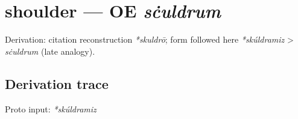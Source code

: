 \documentclass[
  british,
  a4paper,
  openany]{book}
\providecommand{\texorpdfstring}[2]{#1}
\begin{document}
\section{\texorpdfstring{shoulder --- OE
\emph{sċuldrum}}{shoulder --- OE sċuldrum}}\label{shoulder-oe-sux10buldrum}


Derivation: citation reconstruction \emph{*skuldrō}; form followed here
\emph{*skúldramiz} \textgreater{} \emph{sċuldrum} (late analogy).

\subsection{Derivation trace}\label{derivation-trace-122}

Proto input: \emph{*skúldramiz}

\begingroup
\setlength{\fboxsep}{6pt}
\end{document}
